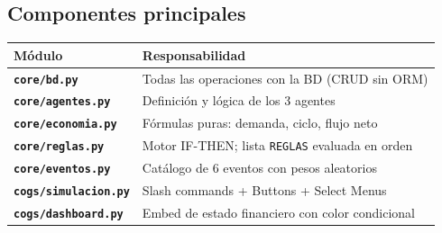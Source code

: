 \documentclass[12pt,spanish]{article}
\begin{document}
\begin{center}
\end{center}

\subsection*{Componentes principales}

\begin{center}
\begin{tabular}{>{\bfseries}p{3.5cm} p{9cm}}
  \toprule
  Módulo & Responsabilidad \\
  \midrule
  \texttt{core/bd.py} & Todas las operaciones con la BD (CRUD sin ORM) \\
  \texttt{core/agentes.py} & Definición y lógica de los 3 agentes \\
  \texttt{core/economia.py} & Fórmulas puras: demanda, ciclo, flujo neto \\
  \texttt{core/reglas.py} & Motor IF-THEN; lista \texttt{REGLAS} evaluada en orden \\
  \texttt{core/eventos.py} & Catálogo de 6 eventos con pesos aleatorios \\
  \texttt{cogs/simulacion.py} & Slash commands + Buttons + Select Menus \\
  \texttt{cogs/dashboard.py} & Embed de estado financiero con color condicional \\
  \bottomrule
\end{tabular}
\end{center}

\end{document}
